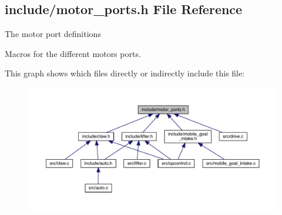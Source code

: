 \subsection{include/motor\+\_\+ports.h File Reference}
\label{motor__ports_8h}


The motor port definitions

Macros for the different motors ports.  


This graph shows which files directly or indirectly include this file\+:\nopagebreak
\begin{figure}[H]
\begin{center}
\leavevmode
\includegraphics[width=350pt]{motor__ports_8h__dep__incl}
\end{center}
\end{figure}
